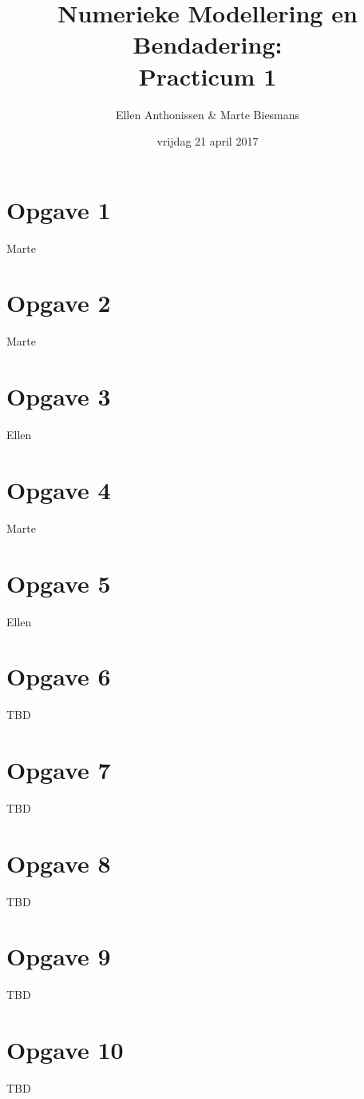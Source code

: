 \documentclass[a4paper]{article}
\title{Numerieke Modellering en Bendadering:\\
	Practicum 1}
\author{Ellen Anthonissen & Marte Biesmans}
\date{vrijdag 21 april 2017}
\newcommand{\opgave}[1]{\section*{Opgave #1}}
\begin{document}
\maketitle
\opgave{1}
Marte

\opgave{2}
Marte

\opgave{3}
Ellen

\opgave{4}
Marte

\opgave{5}
Ellen

\opgave{6}
TBD

\opgave{7}
TBD

\opgave{8}
TBD

\opgave{9}
TBD

\opgave{10}
TBD
\end{document}
